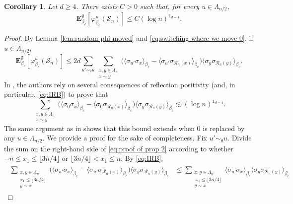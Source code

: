 \documentclass[10pt,a4paper]{amsart}
\numberwithin{equation}{section}
\newtheorem{Coro}[Thm]{Corollary}
\begin{document}
\begin{Coro}\label{coro:bound translate random s_n} Let $d\geq 4$. There exists $C>0$ such that, for every $u\in \Lambda_{n/2}$, 
\begin{equation}
	\mathbf E_{\beta_c}^\emptyset[\varphi_{\beta_c}^u(\mathcal S_n)]\leq C(\log n)^{\mathds{1}_{d=4}}.
\end{equation}
\end{Coro}
\begin{proof} By Lemma \ref{lem:random phi moved} and \eqref{eq:switching where we move 0}, if $u\in \Lambda_{n/2}$,
\begin{equation}\label{eq:proof of prop 2}
	\mathbf E_{\beta_c}^\emptyset[\varphi_{\beta_c}^u(\mathcal S_n)]\leq 2d\sum_{u'\sim_\theta u}\sum_{\substack{x,y\in \Lambda_n\\x\sim y}}\Big(\langle \sigma_{u'}\sigma_x\rangle_{\beta_c}-\langle \sigma_{u'}\sigma_{\mathcal R_n(x)}\rangle_{\beta_c}\Big)\langle \sigma_y\sigma_{\mathcal R_n(y)}\rangle_{\beta_c}.
	\end{equation}
In \cite[Theorem~1.3]{DuminilPanis2024newLB}, the authors rely on several consequences of reflection positivity (and, in particular, \eqref{eq:IRB}) to prove that
\begin{equation}\label{eq:proof of prop 3}
	\sum_{\substack{x,y\in \Lambda_n\\x\sim y}}\Big(\langle \sigma_{0}\sigma_x\rangle_{\beta_c}-\langle \sigma_{0}\sigma_{\mathcal R_n(x)}\rangle_{\beta_c}\Big)\langle \sigma_y\sigma_{\mathcal R_n(y)}\rangle_{\beta_c}\lesssim (\log n)^{\mathds{1}_{d=4}}.\end{equation}
		The same argument as in \cite{DuminilPanis2024newLB} shows that this bound extends when $0$ is replaced by any $u\in \Lambda_{n/2}$. We provide a proof for the sake of completeness. Fix $u'\sim_\theta u$. Divide the sum on the right-hand side of \eqref{eq:proof of prop 2} according to whether $-n\leq x_1\leq \lfloor 3n/4\rfloor $ or  $\lfloor 3n/4\rfloor  < x_1\leq n$.  By \eqref{eq:IRB}, 
\begin{align}\label{eq:proof of prop 3.3}
\begin{aligned}
    \sum_{\substack{x,y\in \Lambda_n\\x_1\leq \lfloor 3n/4\rfloor \\y\sim x}}\Big(\langle \sigma_{u'}\sigma_x\rangle_{\beta_c}-\langle \sigma_{u'}\sigma_{\mathcal{R}_n(x)}\rangle_{\beta_c}\Big)\langle \sigma_y \sigma_{\mathcal{R}_n(y)}\rangle_{\beta_c} &\leq\sum_{\substack{x,y\in \Lambda_n\\ \: x_1\leq \lfloor 3n/4\rfloor \\y\sim x}}\langle\sigma_{u'}\sigma_x\rangle_{\beta_c}\langle \sigma_y\sigma_{\mathcal{R}_n(y)}\rangle_{\beta_c}

\end{aligned}
\end{align}
\end{proof}
\end{document}
